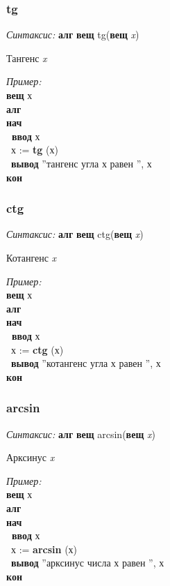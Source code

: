 \documentclass[12pt,a4paper]{article}
\newcommand{\otstup}{\textperiodcentered\ }
\begin{document}
\normalfont
\subsubsection{tg}

\emph{Синтаксис:} \textbf{алг} \textbf{вещ} tg(\textbf{вещ} \emph{x})


     
 
		Тангенс \emph{x}
      
\emph{Пример:} 
\sffamily
~\\\textbf{вещ} х
~\\\textbf{алг 
~\\нач
~\\\otstup ввод} х
~\\\otstup х := \textbf{tg} (х)
~\\\otstup \textbf{вывод} ''тангенс угла х равен '', х
~\\\textbf{кон}


 
\normalfont
\subsubsection{ctg}

\emph{Синтаксис:} \textbf{алг} \textbf{вещ} ctg(\textbf{вещ} \emph{x})


    
  
		Котангенс \emph{x}
      
\emph{Пример:} 
\sffamily
~\\\textbf{вещ} х
~\\\textbf{алг 
~\\нач
~\\\otstup ввод} х
~\\\otstup х := \textbf{ctg} (х)
~\\\otstup \textbf{вывод} ''котангенс угла х равен '', х
~\\\textbf{кон}

\normalfont
\subsubsection{arcsin}

\emph{Синтаксис:} \textbf{алг} \textbf{вещ} arcsin(\textbf{вещ} \emph{x})


      
		
Арксинус \emph{x}
      
\emph{Пример:}  
\sffamily
~\\\textbf{вещ} х
~\\\textbf{алг 
~\\нач
~\\\otstup ввод} х
~\\\otstup х := \textbf{arcsin} (х)
~\\\otstup \textbf{вывод} ''арксинус числа х равен '', х
~\\\textbf{кон}
\end{document}
